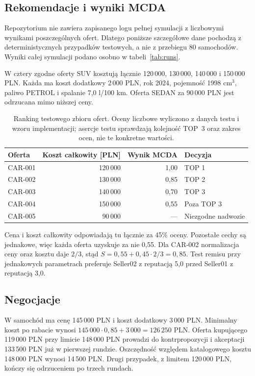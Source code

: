 \subsection{Rekomendacje i wyniki MCDA}
Repozytorium nie zawiera zapisanego logu pełnej symulacji z liczbowymi
wynikami poszczególnych ofert. Dlatego poniższe szczegółowe dane
pochodzą z deterministycznych przypadków testowych, a nie z przebiegu
80 samochodów. Wyniki całej symulacji podano osobno w tabeli~\ref{tab:runs}.

W  cztery zgodne oferty SUV kosztują
łącznie 120\,000, 130\,000, 140\,000 i 150\,000 PLN.
Każda ma koszt dodatkowy 2\,000 PLN, rok 2024, pojemność 1998 cm$^3$,
paliwo PETROL i spalanie 7,0 l/100 km. Oferta SEDAN za 90\,000 PLN
jest odrzucana mimo niższej ceny.

\begin{table}[htbp]
\centering
\begin{tabular}{lrrl}
\toprule
Oferta & Koszt całkowity [PLN] & Wynik MCDA & Decyzja\\
\midrule
CAR-001 & 120\,000 & 1,00 & TOP 1\\
CAR-002 & 130\,000 & 0,85 & TOP 2\\
CAR-003 & 140\,000 & 0,70 & TOP 3\\
CAR-004 & 150\,000 & 0,55 & Poza TOP 3\\
CAR-005 & 90\,000 & --- & Niezgodne nadwozie\\
\bottomrule
\end{tabular}
\caption{Ranking testowego zbioru ofert. Oceny liczbowe wyliczono
z danych testu i wzoru implementacji; asercje testu sprawdzają
kolejność TOP~3 oraz zakres ocen, nie te konkretne wartości.}
\end{table}

Cena i koszt całkowity odpowiadają tu łącznie za 45\% oceny.
Pozostałe cechy są jednakowe, więc każda oferta uzyskuje za nie 0,55.
Dla CAR-002 normalizacja ceny oraz kosztu daje $2/3$, stąd
$S=0{,}55+0{,}45\cdot2/3=0{,}85$.
Test remisu przy jednakowych parametrach preferuje Seller02
z reputacją 5,0 przed Seller01 z reputacją 3,0.

\subsection{Negocjacje}
W  samochód ma cenę 145\,000 PLN
i koszt dodatkowy 3\,000 PLN. Minimalny koszt po rabacie wynosi
$145\,000\cdot0{,}85+3\,000=126\,250$ PLN.
Oferta kupującego 119\,000 PLN przy limicie 148\,000 PLN prowadzi
do kontrpropozycji i akceptacji 133\,500 PLN już w pierwszej rundzie.
Oszczędność względem katalogowego kosztu 148\,000 PLN wynosi
14\,500 PLN. Drugi przypadek, z limitem 120\,000 PLN,
kończy się odrzuceniem po trzech rundach.

